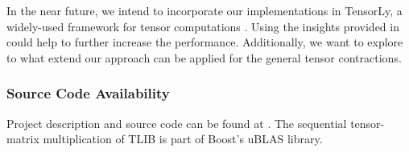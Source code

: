 In the near future, we intend to incorporate our implementations in TensorLy, a widely-used framework for tensor computations \cite{cohen:2022:tensor.computations, kossaifi:2019:tensorly}.
Using the insights provided in \cite{li:2015:input} could help to further increase the performance.
Additionally, we want to explore to what extend our approach can be applied for the general tensor contractions.

\subsubsection{Source Code Availability}
Project description and source code can be found at .
The sequential tensor-matrix multiplication of TLIB is part of Boost's uBLAS library.